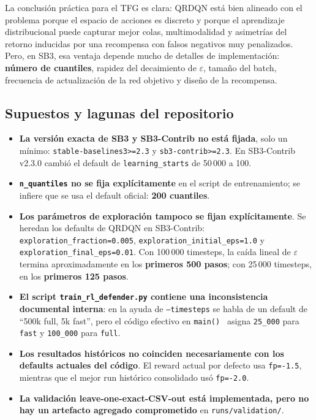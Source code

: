 ﻿\documentclass[12pt,a4paper]{article}
\begin{document}
La conclusión práctica para el TFG es clara: QRDQN está bien alineado con el problema porque el
espacio de acciones es discreto y porque el aprendizaje distribucional puede capturar mejor colas,
multimodalidad y asimetrías del retorno inducidas por una recompensa con falsos negativos muy
penalizados. Pero, en SB3, esa ventaja depende mucho de detalles de implementación:
\textbf{número de cuantiles}, rapidez del decaimiento de \(\varepsilon\), tamaño del batch,
frecuencia de actualización de la red objetivo y diseño de la recompensa.

\subsection{Supuestos y lagunas del repositorio}

\begin{itemize}
  \item \textbf{La versión exacta de SB3 y SB3-Contrib no está fijada}, solo un mínimo:
        \texttt{stable-baselines3>=2.3} y \texttt{sb3-contrib>=2.3}. En SB3-Contrib v2.3.0 cambió
        el default de \texttt{learning\_starts} de 50\,000 a 100.

  \item \textbf{\texttt{n\_quantiles} no se fija explícitamente} en el script de entrenamiento; se
        infiere que se usa el default oficial: \textbf{200 cuantiles}.

  \item \textbf{Los parámetros de exploración tampoco se fijan explícitamente}. Se heredan los
        defaults de QRDQN en SB3-Contrib: \texttt{exploration\_fraction=0.005},
        \texttt{exploration\_initial\_eps=1.0} y \texttt{exploration\_final\_eps=0.01}. Con
        100\,000 timesteps, la caída lineal de \(\varepsilon\) termina aproximadamente en los
        \textbf{primeros 500 pasos}; con 25\,000 timesteps, en los \textbf{primeros 125 pasos}.

    \item \textbf{El script \texttt{train\_rl\_defender.py} contiene una inconsistencia documental
      interna}: en la ayuda de \texttt{--timesteps} se habla de un default de ``500k full, 5k
      fast'', pero el código efectivo en \texttt{main() } asigna \texttt{25\_000} para
        \texttt{fast} y \texttt{100\_000} para \texttt{full}.

  \item \textbf{Los resultados históricos no coinciden necesariamente con los defaults actuales del
        código}. El reward actual por defecto usa \texttt{fp=-1.5}, mientras que el mejor run
        histórico consolidado usó \texttt{fp=-2.0}.

  \item \textbf{La validación leave-one-exact-CSV-out está implementada, pero no hay un artefacto
        agregado comprometido} en \verb|runs/validation/|.
\end{itemize}
\end{document}
